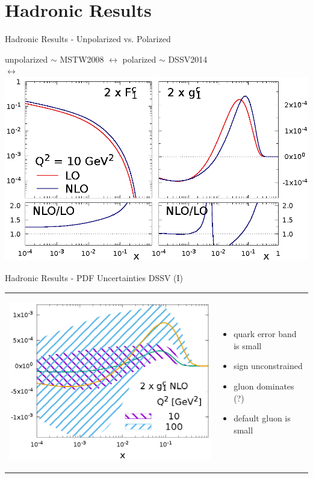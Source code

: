 \section{Hadronic Results}
\begin{frame}{Hadronic Results - Unpolarized vs. Polarized}
\begin{center}
unpolarized $\sim$ MSTW2008 $\leftrightarrow$ polarized $\sim$ DSSV2014\quad\,\,\,\\
\quad\quad\quad{} $\leftrightarrow$ 
\includegraphics[width=.8\textwidth]{img/F1g1}
\end{center}
\end{frame}

\begin{frame}{Hadronic Results - PDF Uncertainties DSSV (I)}
\hspace{-1cm}\begin{tabular}{wn}
\begin{center}
\includegraphics[width=.7\textwidth]{img/g1NLO-pdf}
\end{center} & 
\begin{itemize}
\item quark error band is small
\item sign unconstrained
\item gluon dominates (?)
\item default gluon is small
\end{itemize}
\end{tabular}
\end{frame}


